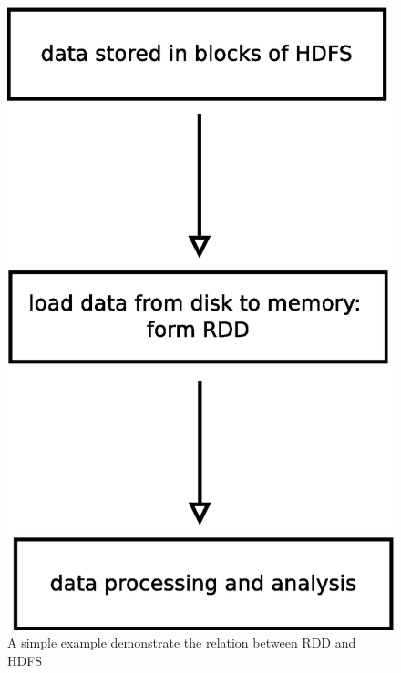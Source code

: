 \documentclass[notheorems, aspectratio=54]{beamer}
\begin{document}

\begin{frame}

\begin{figure}
 \includegraphics[scale=0.4]{rdd1}
\caption{A simple example demonstrate the relation between RDD and HDFS}
\end{figure} 

\end{frame}


\end{document}
